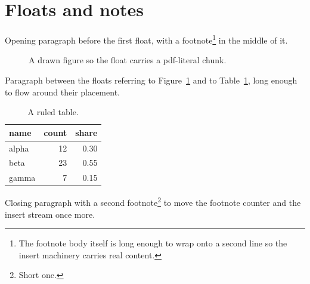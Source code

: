 \documentclass[11pt,a4paper]{article}
\begin{document}
\section{Floats and notes}

Opening paragraph before the first float, with a footnote\footnote{The
footnote body itself is long enough to wrap onto a second line so the
insert machinery carries real content.} in the middle of it.

\begin{figure}[htbp]
  \centering
  \caption{A drawn figure so the float carries a pdf-literal chunk.}
  \label{fig:one}
\end{figure}

Paragraph between the floats referring to Figure~\ref{fig:one} and to
Table~\ref{tab:one}, long enough to flow around their placement.

\begin{table}[htbp]
  \centering
  \begin{tabular}{lrr}
    \toprule
    name & count & share \\
    \midrule
    alpha & 12 & 0.30 \\
    beta  & 23 & 0.55 \\
    gamma &  7 & 0.15 \\
    \bottomrule
  \end{tabular}
  \caption{A ruled table.}
  \label{tab:one}
\end{table}

Closing paragraph with a second footnote\footnote{Short one.} to move the
footnote counter and the insert stream once more.
\end{document}
